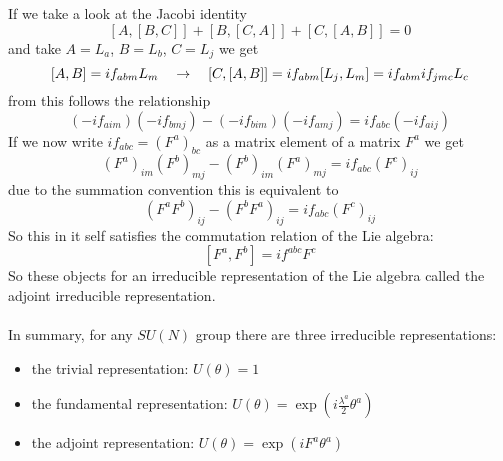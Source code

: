 If we take a look at the Jacobi identity
\[ [A,[B,C]] + [B,[C,A]] + [C,[A,B]] = 0\]
and take $A = L_a$, $B= L_b$, $C=L_j$ we get
\[ [A,B] = i f_{abm} L_m ~~~\rightarrow~~~ [C,[A,B]] = i f_{abm}[L_j,L_m] = if_{abm}if_{jmc} L_c\]
from this follows the relationship
\[ (-if_{aim})(-if_{bmj}) - (-if_{bim})(-if_{amj}) = if_{abc}(-if_{aij})\]
If we now write $if_{abc} = (F^a)_{bc}$ as a matrix element of a matrix $F^a$ we get
\[ (F^a)_{im} (F^b)_{mj} - (F^b)_{im}(F^a)_{mj} = i f_{abc} (F^c)_{ij}\]
due to the summation convention this is equivalent to
\[ (F^aF^b)_{ij} - (F^bF^a)_{ij} = if_{abc}(F^c)_{ij}\]
So this in it self satisfies the commutation relation of the Lie algebra:
\[ [F^a, F^b] = i f^{abc} F^c\]
So these objects for an irreducible representation of the Lie algebra called the adjoint irreducible representation.\\
\\
In summary, for any $SU(N)$ group there are three irreducible representations:
\begin{itemize}
\item the trivial representation: $U(\theta) = 1$
\item the fundamental representation: $U(\theta) = \exp\left( i \frac{\lambda^a}{2} \theta^a\right)$
\item the adjoint representation: $U(\theta) = \exp \left( i F^a \theta ^a\right)$
\end{itemize}


